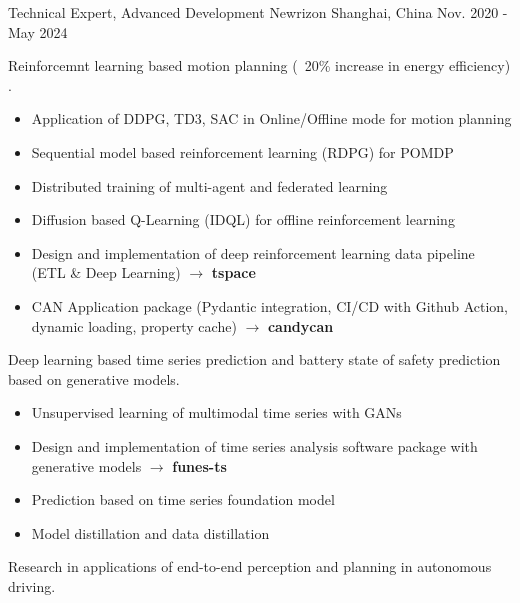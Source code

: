 \documentclass[../cv.tex]{subfiles}
\begin{document}
\begin{cventries}
	\breakablecventry
	{Technical Expert, Advanced Development} %
	{Newrizon} %
	{Shanghai, China} %
	{Nov. 2020 - May 2024} %
	{
		\begin{cvitems} %
			\item Reinforcemnt learning based motion planning (~20\% increase in energy efficiency)
			\supercite{Xin_VEOS_22} \supercite{Xin_Fu_Pan_Simulation_Test_RL_22} \supercite{Pan_Xin_DrvStyle_23}.
			\begin{itemize}
				\item Application of DDPG, TD3, SAC in Online/Offline mode for motion planning
				\item Sequential model based reinforcement learning (RDPG)  for POMDP
				\item Distributed training of multi-agent and federated learning
				\item Diffusion based Q-Learning (IDQL) for offline reinforcement learning
				\item Design and implementation of deep reinforcement learning data pipeline (ETL \& Deep Learning)
				      $\rightarrow$ \textbf{tspace} \href{https://binjian.github.io/tspace/}{\faGithub}
				\item CAN Application package (Pydantic integration, CI/CD with Github Action, dynamic loading, property cache)
				      $\rightarrow$ \textbf{candycan} \href{https://binjian.github.io/candycan/}{\faGithub}
			\end{itemize}
			\item Deep learning based time series prediction and battery state of safety prediction based on generative models. \supercite{Xin_GenAI_23} \supercite{Xin_Chen_NN_TSFeatures_23}
			\begin{itemize}
				\item Unsupervised learning of multimodal time series with GANs
				\item Design and implementation of time series analysis software package with generative models
				      $\rightarrow$ \textbf{funes-ts} \href{https://github.com/binjian/funes-ts/}{\faGithub}
				\item Prediction based on time series foundation model
				\item Model distillation and data distillation
			\end{itemize}
			\pagebreak
			\item Research in applications of end-to-end perception and planning in autonomous driving.
			\begin{itemize}

\end{itemize}
\end{cvitems}}
\end{cventries}
\end{document}
